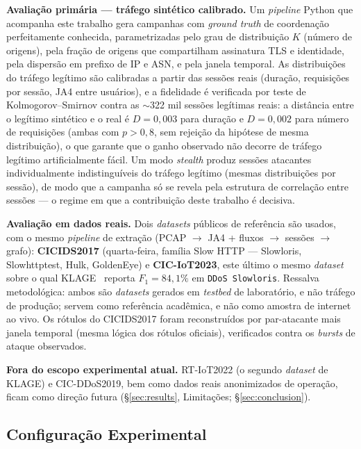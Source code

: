 \documentclass[preprint,12pt]{elsarticle}
\begin{document}
\textbf{Avaliação primária --- tráfego sintético calibrado.} Um \emph{pipeline} Python que acompanha este trabalho gera campanhas com \emph{ground truth} de coordenação perfeitamente conhecida, parametrizadas pelo grau de distribuição $K$ (número de origens), pela fração de origens que compartilham assinatura TLS e identidade, pela dispersão em prefixo de IP e ASN, e pela janela temporal. As distribuições do tráfego legítimo são calibradas a partir das sessões reais (duração, requisições por sessão, JA4 entre usuários), e a fidelidade é verificada por teste de Kolmogorov--Smirnov contra as $\sim$322 mil sessões legítimas reais: a distância entre o legítimo sintético e o real é $D = 0{,}003$ para duração e $D = 0{,}002$ para número de requisições (ambas com $p > 0{,}8$, sem rejeição da hipótese de mesma distribuição), o que garante que o ganho observado não decorre de tráfego legítimo artificialmente fácil. Um modo \emph{stealth} produz sessões atacantes individualmente indistinguíveis do tráfego legítimo (mesmas distribuições por sessão), de modo que a campanha só se revela pela estrutura de correlação entre sessões --- o regime em que a contribuição deste trabalho é decisiva.

\textbf{Avaliação em dados reais.} Dois \emph{datasets} públicos de referência são usados, com o mesmo \emph{pipeline} de extração (PCAP $\rightarrow$ JA4 + fluxos $\rightarrow$ sessões $\rightarrow$ grafo): \textbf{CICIDS2017} (quarta-feira, família Slow HTTP --- Slowloris, Slowhttptest, Hulk, GoldenEye) e \textbf{CIC-IoT2023}, este último o mesmo \emph{dataset} sobre o qual KLAGE~\cite{belcastro2025klage} reporta $F_1 = 84{,}1\%$ em \texttt{DDoS Slowloris}. Ressalva metodológica: ambos são \emph{datasets} gerados em \emph{testbed} de laboratório, e não tráfego de produção; servem como referência acadêmica, e não como amostra de internet ao vivo. Os rótulos do CICIDS2017 foram reconstruídos por par-atacante mais janela temporal (mesma lógica dos rótulos oficiais), verificados contra os \emph{bursts} de ataque observados.

\textbf{Fora do escopo experimental atual.} RT-IoT2022 (o segundo \emph{dataset} de KLAGE) e CIC-DDoS2019, bem como dados reais anonimizados de operação, ficam como direção futura (§\ref{sec:results}, Limitações; §\ref{sec:conclusion}).

\subsection{Configuração Experimental}
\end{document}
